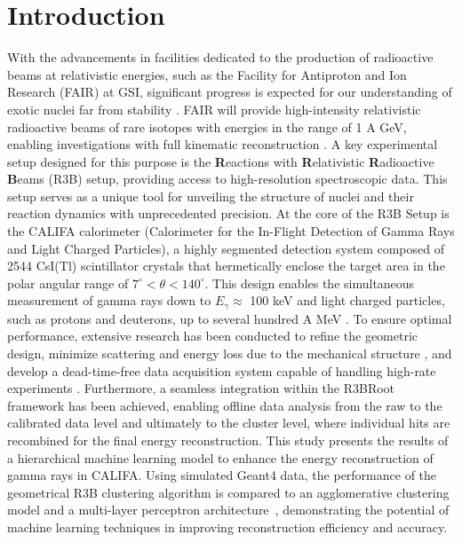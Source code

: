 \documentclass[final,5p,times,twocolumn]{elsarticle}
\begin{document}
\section{Introduction}
\label{sec:intro}
With the advancements in facilities dedicated to the production of radioactive beams at relativistic energies, such as the Facility for Antiproton and Ion Research (FAIR) at GSI, significant progress is expected for our understanding of exotic nuclei far from stability \cite{kalantar2024experiments}. FAIR will provide high-intensity relativistic radioactive beams of rare isotopes with energies in the range of 1 A GeV, enabling investigations with full kinematic reconstruction \cite{leifels2025status}.
A key experimental setup designed for this purpose is the \textbf{R}eactions with \textbf{R}elativistic \textbf{R}adioactive \textbf{B}eams (R3B) setup, providing access to high-resolution spectroscopic data. This setup serves as a unique tool for unveiling the structure of nuclei and their reaction dynamics with unprecedented precision.\newline
At the core of the R3B Setup is the CALIFA calorimeter (Calorimeter for the In-Flight Detection of Gamma Rays and Light Charged Particles), a highly segmented detection system composed of 2544 CsI(Tl) scintillator crystals that hermetically enclose the target area in the polar angular range of $7^\circ < \theta < 140^\circ$. This design enables the simultaneous measurement of gamma rays down to $E_{\gamma} \approx$ 100 keV and light charged particles, such as protons and deuterons, up to several hundred A MeV \cite{cortina2014califa}. To ensure optimal performance, extensive research has been conducted to refine the geometric design, minimize scattering and energy loss due to the mechanical structure \cite{alvarez2014performance}, and develop a dead-time-free data acquisition system capable of handling high-rate experiments \cite{ledigital}. Furthermore, a seamless integration within the R3BRoot framework \cite{bertini2011r3broot} has been achieved, enabling offline data analysis from the raw to the calibrated data level and ultimately to the cluster level, where individual hits are recombined for the final energy reconstruction.\newline
This study presents the results of a hierarchical machine learning model to enhance the energy reconstruction of gamma rays in CALIFA. Using simulated Geant4 data, the performance of the geometrical R3B clustering algorithm is compared to an agglomerative clustering model \cite{Nielsen2016} and a multi-layer perceptron architecture~\cite{popescu2009multilayer}, demonstrating the potential of machine learning techniques in improving reconstruction efficiency and accuracy.\newline
\end{document}
